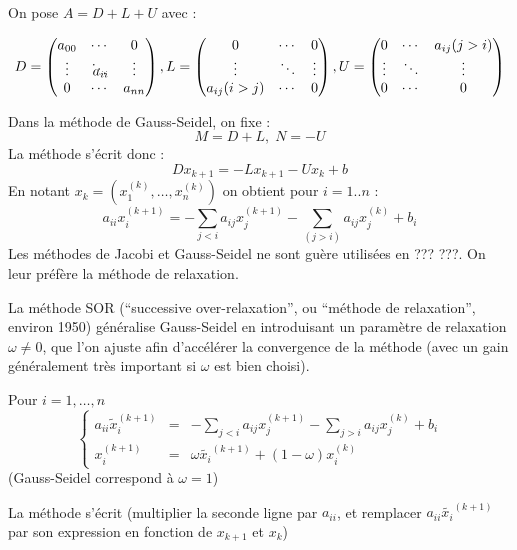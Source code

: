 \documentclass[a4paper,11pt]{article}
\theoremstyle{plain} %
\begin{document}
On pose $A = D + L + U$ avec :

\[
   D =
   \begin{pmatrix}
       a_{00} & \cdots                      & 0      \\ 
       \vdots & a_{ii}\hspace{-0.5cm}\ddots & \vdots \\ 
       0      & \cdots                      & a_{nn}
   \end{pmatrix} 
   , L =
   \begin{pmatrix}
        0        & \cdots & 0      \\
        \vdots   & \ddots & \vdots \\
        a_{ij}(i>j)      & \cdots & 0
   \end{pmatrix}
   , U =
   \begin{pmatrix}
        0        & \cdots & a_{ij}(j>i)     \\
        \vdots   & \ddots & \vdots \\
        0        & \cdots & 0
   \end{pmatrix}
\]

Dans la méthode de Gauss-Seidel, on fixe :
\[
    M = D+L, \; N = -U
\]
La méthode s'écrit donc :
\[
    Dx_{k+1} = -Lx_{k+1}-Ux_k + b
\]
En notant $x_k = (x^{(k)}_1,\dots,x^{(k)}_n)$ on obtient pour $i=1..n$ :
\[
    a_{ii}x^{(k+1)}_i = - \sum_{j<i}a_{ij}x_j^{(k+1)} - \sum_{(j>i)}a_{ij}x_j^{(k)} + b_i
\]
Les méthodes de Jacobi et Gauss-Seidel ne sont guère utilisées en ??? ???. On leur préfère la méthode de relaxation.

La méthode SOR (``successive over-relaxation'', ou ``méthode de relaxation'', environ 1950) généralise Gauss-Seidel en introduisant un paramètre de relaxation $\omega \ne 0$,
que l'on ajuste afin d'accélérer la convergence de la méthode (avec un gain généralement très important si $\omega$ est bien choisi).

Pour $i=1,\dots,n$
\begin{equation}
\left\lbrace
\begin{array}{ccc}
    a_{ii}\tilde{x}_i^{(k+1)} & = & -\sum_{j<i} a_{ij}x_j^{(k+1)} - \sum_{j>i}a_{ij}x_j^{(k)} + b_i\\
    x_i^{(k+1)} & = & \omega \tilde{x_i}^{(k+1)} + (1-\omega)x_i^{(k)}
    \label{eq:4}
\end{array}\right.
\end{equation}
(Gauss-Seidel correspond à $\omega = 1$)

La méthode s'écrit (multiplier la seconde ligne par $a_{ii}$, et remplacer $a_{ii}\tilde{x_i}^{(k+1)}$ par son expression en fonction de $x_{k+1}$ et $x_k$)
\end{document}
